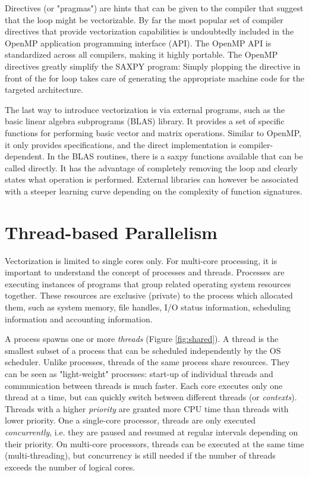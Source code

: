 Directives (or "pragmas") are hints that can be given to the compiler that suggest that the loop might be vectorizable. By far the most popular set of compiler directives that provide vectorization capabilities is undoubtedly included in the OpenMP application programming interface (API). The OpenMP API is standardized across all compilers, making it highly portable. The OpenMP directives greatly simplify the SAXPY program:
\noindent Simply plopping the directive in front of the for loop takes care of generating the appropriate machine code for the targeted architecture. 

The last way to introduce vectorization is via external programs, such as the basic linear algebra subprograms (BLAS) library. It provides a set of specific functions for performing basic vector and matrix operations. Similar to OpenMP, it only provides specifications, and the direct implementation is compiler-dependent. In the BLAS routines, there is a saxpy functions available that can be called directly. It has the advantage of completely removing the loop and clearly states what operation is performed.
\noindent External libraries can however be associated with a steeper learning curve depending on the complexity of function signatures.

\section{Thread-based Parallelism}

Vectorization is limited to single cores only. For multi-core processing, it is important to understand the concept of processes and threads. Processes are executing instances of programs that group related operating system resources together. These resources are exclusive (private) to the process which allocated them, such as system memory, file handles, I/O status information, scheduling information and accounting information. 

A process spawns one or more \emph{threads} (Figure \ref{fig:shared}). A thread is the smallest subset of a process that can be scheduled independently by the OS scheduler. Unlike processes, threads of the same process share resources. They can be seen as "light-weight" processes: start-up of individual threads and communication between threads is much faster. Each core executes only  one thread at a time, but can quickly switch between different threads (or \emph{contexts}). Threads with a higher \emph{priority} are granted more CPU time than threads with lower priority. One a single-core processor, threads are only executed \emph{concurrently}, i.e. they are paused and resumed at regular intervals depending on their priority. On multi-core processors, threads can be executed at the same time (multi-threading), but concurrency is still needed if the number of threads exceeds the number of logical cores.

